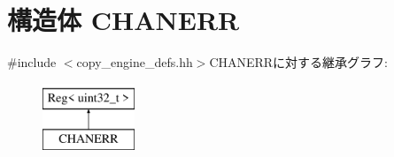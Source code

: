 \hypertarget{structCopyEngineReg_1_1ChanRegs_1_1CHANERR}{
\section{構造体 CHANERR}
\label{structCopyEngineReg_1_1ChanRegs_1_1CHANERR}
}


{\ttfamily \#include $<$copy\_\-engine\_\-defs.hh$>$}CHANERRに対する継承グラフ:\begin{figure}[H]
\begin{center}
\leavevmode
\includegraphics[height=2cm]{structCopyEngineReg_1_1ChanRegs_1_1CHANERR}
\end{center}
\end{figure}
